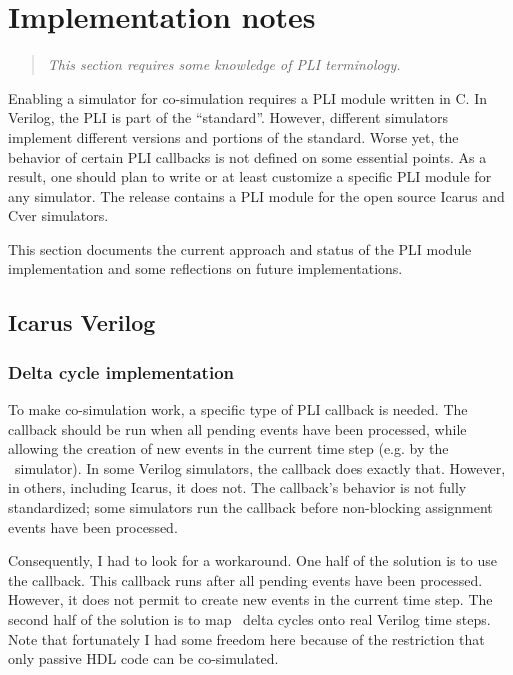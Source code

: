 \section{Implementation notes \label{cosim-impl}}

\begin{quote}
\em
This section requires some knowledge of PLI terminology.
\end{quote}

Enabling a simulator for co-simulation requires a PLI module written
in C. In Verilog, the PLI is part of the ``standard''.  However,
different simulators implement different versions and portions of the
standard. Worse yet, the behavior of certain PLI callbacks is not
defined on some essential points.  As a result, one should plan to
write or at least customize a specific PLI module for any simulator.
The release contains a PLI module for the open source Icarus
and Cver simulators. 

This section documents the current approach and status of the PLI
module implementation and some reflections on future
implementations.

\subsection{Icarus Verilog \label{cosim-icarus}}

\subsubsection{Delta cycle implementation \label{cosim-icarus-delta}}

To make co-simulation work, a specific type of PLI callback is
needed. The callback should be run when all pending events have been
processed, while allowing the creation of new events in the current
time step (e.g. by the \myhdl\ simulator).  In some Verilog
simulators, the  callback does exactly
that. However, in others, including Icarus, it does not. The
callback's behavior is not fully standardized; some simulators run the
callback before non-blocking assignment events have been processed.

Consequently, I had to look for a workaround. One half of the solution
is to use the  callback.  This callback runs
after all pending events have been processed.  However, it does not
permit to create new events in the current time step.  The second half
of the solution is to map \myhdl\ delta cycles onto real Verilog time
steps.  Note that fortunately I had some freedom here because of the
restriction that only passive HDL code can be co-simulated.


